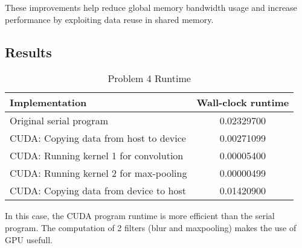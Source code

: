 \documentclass[11pt]{article}
\begin{document}
These improvements help reduce global memory bandwidth usage and increase performance by exploiting data reuse in shared memory.
\subsection{Results}
\label{sec:org603541e}

\begin{table}[htbp]
\caption{Problem 4 Runtime}
\centering
\begin{tabular}{|l|c|}
\hline
Implementation & Wall-clock runtime\\
\hline
Original serial program & 0.02329700\\
\hline
CUDA: Copying data from host to device & 0.00271099\\
\hline
CUDA: Running kernel 1 for convolution & 0.00005400\\
\hline
CUDA: Running kernel 2 for max-pooling & 0.00000499\\
\hline
CUDA: Copying data from device to host & 0.01420900\\
\hline
\end{tabular}
\end{table}

In this case, the CUDA program runtime is more efficient than the serial program. The computation of 2 filters (blur and maxpooling) makes the use of GPU usefull.
\end{document}
